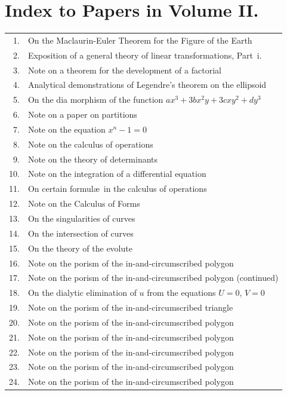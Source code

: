\documentclass[11pt,a4paper]{article}
\begin{document}
\section*{Index to Papers in Volume II.}

\begin{longtable}{rp{}}
1. & On the Maclaurin-Euler Theorem for the Figure of the Earth \\
2. & Exposition of a general theory of linear transformations, Part~i. \\
3. & Note on a theorem for the development of a factorial \\
4. & Analytical demonstrations of Legendre's theorem on the ellipsoid \\
5. & On the dia morphism of the function $ax^3+3bx^2y+3cxy^2+dy^3$ \\
6. & Note on a paper on partitions \\
7. & Note on the equation $x^n-1=0$ \\
8. & Note on the calculus of operations \\
9. & Note on the theory of determinants \\
10. & Note on the integration of a differential equation \\
11. & On certain formul\ae\ in the calculus of operations \\
12. & Note on the Calculus of Forms \\
13. & On the singularities of curves \\
14. & On the intersection of curves \\
15. & On the theory of the evolute \\
16. & Note on the porism of the in-and-circumscribed polygon \\
17. & Note on the porism of the in-and-circumscribed polygon (continued) \\
18. & On the dialytic elimination of $u$ from the equations $U=0$, $V=0$ \\
19. & Note on the porism of the in-and-circumscribed triangle \\
20. & Note on the porism of the in-and-circumscribed polygon \\
21. & Note on the porism of the in-and-circumscribed polygon \\
22. & Note on the porism of the in-and-circumscribed polygon \\
23. & Note on the porism of the in-and-circumscribed polygon \\
24. & Note on the porism of the in-and-circumscribed polygon \\

\end{longtable}
\end{document}
